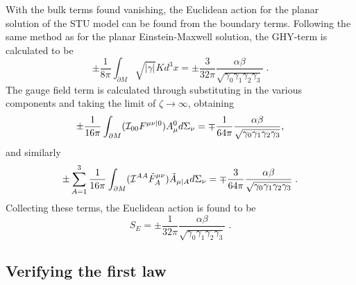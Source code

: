 With the bulk terms found vanishing, the Euclidean action for the planar solution of the STU model can be found from the boundary terms. Following the same method as for the planar Einstein-Maxwell solution, the GHY-term is calculated to be
\begin{equation*}
    \pm  \frac{1}{8\pi} \int_{\partial M} \sqrt{|\gamma|}K d^3x = \pm  \frac{3}{32\pi} \frac{\alpha \beta}{\sqrt{\gamma_0 \gamma_1 \gamma_2 \gamma_3}}  \;.
\end{equation*} 
The gauge field term is calculated through substituting in the various components and taking the limit of $\zeta \rightarrow \infty$, obtaining
\begin{equation*}
        \pm \frac{1}{16 \pi} \int_{\partial M} ({\cal I}_{00} F^{\mu \nu | 0})A_\mu^0 d\Sigma_\nu = \mp \frac{1}{64\pi} \frac{\alpha \beta}{\sqrt{\gamma_0 \gamma_1 \gamma_2 \gamma_3}},
\end{equation*}
and similarly 
\begin{equation*}
        \pm \sum_{A=1}^3 \frac{1}{16 \pi} \int_{\partial M} ({\cal I}^{AA} \tilde{F}^{\mu \nu}_{A})\tilde{A}_{\mu | A} d\Sigma_\nu = \mp \frac{3}{64\pi} \frac{\alpha \beta}{\sqrt{\gamma_0 \gamma_1 \gamma_2 \gamma_3}}\;.
\end{equation*}    
Collecting these terms, the Euclidean action is found to be
\begin{equation*}
        S_E = \pm \frac{1}{32\pi} \frac{\alpha \beta}{\sqrt{\gamma_0 \gamma_1 \gamma_2 \gamma_3}} \;.\end{equation*}


\subsection{Verifying the first law}
\label{sec:stufirstlaw}

